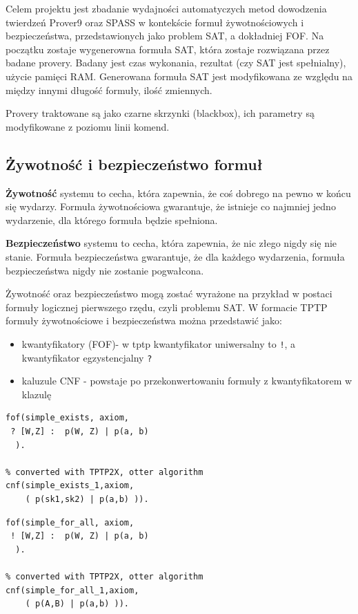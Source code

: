 \documentclass[a4paper,12pt]{article}
\begin{document}
Celem projektu jest zbadanie wydajności automatyczych metod dowodzenia twierdzeń Prover9 oraz SPASS w kontekście formuł żywotnościowych i bezpieczeństwa, przedstawionych jako problem \gls{SAT}, a dokładniej \gls{FOF}. Na początku zostaje wygenerowna formuła \gls{SAT}, która zostaje rozwiązana przez badane provery. Badany jest czas wykonania, rezultat (czy \gls{SAT} jest spełnialny), użycie pamięci RAM.  Generowana formuła \gls{SAT} jest modyfikowana ze względu na między innymi długość formuły, ilość zmiennych.

Provery traktowane są jako czarne skrzynki (blackbox), ich parametry są modyfikowane z poziomu linii komend.

\subsection{Żywotność i bezpieczeństwo formuł}

\textbf{Żywotność} systemu to cecha, która zapewnia, że coś dobrego na pewno w końcu się wydarzy. Formuła żywotnościowa gwarantuje, że istnieje co najmniej jedno wydarzenie, dla którego formuła będzie spełniona.

\textbf{Bezpieczeństwo} systemu to cecha, która zapewnia, że nic złego nigdy się nie stanie. Formuła bezpieczeństwa gwarantuje, że dla każdego wydarzenia, formuła bezpieczeństwa nigdy nie zostanie pogwałcona.

Żywotność oraz bezpieczeństwo mogą zostać wyrażone na przykład w postaci formuły logicznej pierwszego rzędu, czyli problemu SAT.
W formacie TPTP formuły żywotnościowe i bezpieczeństwa można przedstawić jako:
\begin{itemize}
  \item kwantyfikatory (\gls{FOF})- w tptp kwantyfikator uniwersalny to \texttt{!}, a kwantyfikator egzystencjalny \texttt{?}
  \item kaluzule \gls{CNF} - powstaje po przekonwertowaniu formuły z kwantyfikatorem w klazulę
\end{itemize}

\begin{verbatim}
fof(simple_exists, axiom,
 ? [W,Z] :  p(W, Z) | p(a, b)
  ).

% converted with TPTP2X, otter algorithm
cnf(simple_exists_1,axiom,
    ( p(sk1,sk2) | p(a,b) )).
\end{verbatim}

\begin{verbatim}
fof(simple_for_all, axiom,
 ! [W,Z] :  p(W, Z) | p(a, b)
  ).

% converted with TPTP2X, otter algorithm
cnf(simple_for_all_1,axiom,
    ( p(A,B) | p(a,b) )).
\end{verbatim}
\end{document}
